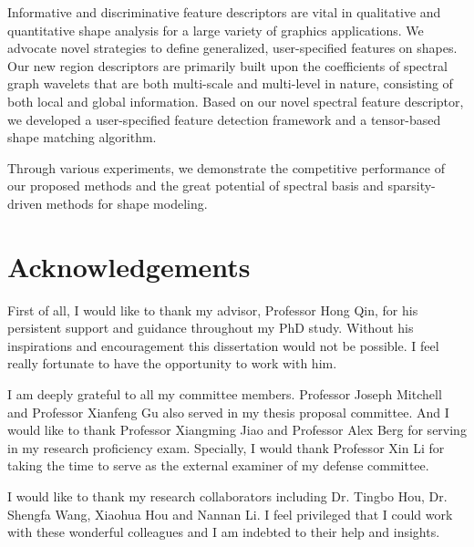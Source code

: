 \documentclass[12pt,letterpaper,twosided]{report}
\numberwithin{equation}{section}
\begin{document}
Informative and discriminative feature descriptors are vital in qualitative and
quantitative shape analysis for a large variety of graphics applications. We
advocate novel strategies to define generalized, user-specified features on
shapes. Our new region descriptors are primarily built upon the coefficients of
spectral graph wavelets that are both multi-scale and multi-level in nature,
consisting of both local and global information. Based on our novel spectral
feature descriptor, we developed a user-specified feature
detection framework and a tensor-based shape matching algorithm.

Through various experiments, we demonstrate the competitive performance of our
proposed methods and the great potential of spectral basis and
sparsity-driven methods for shape modeling. 



\tableofcontents

\clearpage
{}
{}
\listoffigures


\chapter*{Acknowledgements}

First of all, I would like to thank my advisor, Professor Hong Qin, for his
persistent support and guidance throughout my PhD study. Without his
inspirations and encouragement this dissertation would not be possible.
I feel really fortunate to have the opportunity to work with him.

I am deeply grateful to all my committee members. Professor Joseph Mitchell
and Professor Xianfeng Gu also served in my thesis proposal committee. And I
would like to thank Professor Xiangming Jiao and Professor Alex Berg for serving in
my research proficiency exam. Specially, I would thank Professor Xin Li for taking
the time to serve as the external examiner of my defense committee.

I would like to thank my research collaborators including Dr. Tingbo Hou, Dr. Shengfa Wang,
Xiaohua Hou and Nannan Li. I feel privileged that I could work with these wonderful colleagues
and I am indebted to their help and insights.
\end{document}

